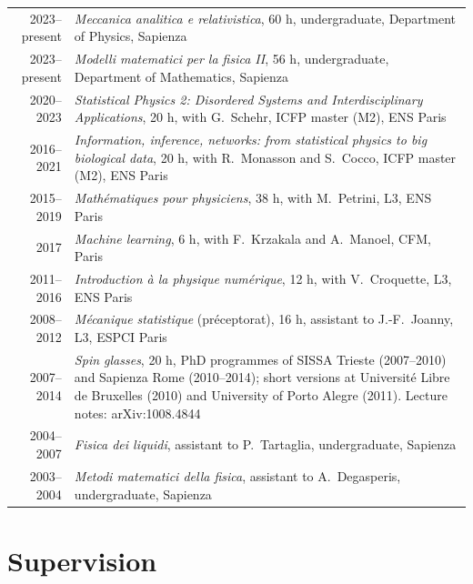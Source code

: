 \documentclass[a4paper,10pt]{article}
\begin{document}
\begin{tabularx}{\textwidth}{@{}D L@{}}
2023--present & \emph{Meccanica analitica e relativistica}, 60 h, undergraduate, Department of Physics, Sapienza \\
2023--present & \emph{Modelli matematici per la fisica II}, 56 h, undergraduate, Department of Mathematics, Sapienza \\
2020--2023 & \emph{Statistical Physics 2: Disordered Systems and Interdisciplinary Applications}, 20 h, with G.~Schehr, ICFP master (M2), ENS Paris \\
2016--2021 & \emph{Information, inference, networks: from statistical physics to big biological data}, 20 h, with R.~Monasson and S.~Cocco, ICFP master (M2), ENS Paris \\
2015--2019 & \emph{Mathématiques pour physiciens}, 38 h, with M.~Petrini, L3, ENS Paris \\
2017 & \emph{Machine learning}, 6 h, with F.~Krzakala and A.~Manoel, CFM, Paris \\
2011--2016 & \emph{Introduction à la physique numérique}, 12 h, with V.~Croquette, L3, ENS Paris \\
2008--2012 & \emph{Mécanique statistique} (préceptorat), 16 h, assistant to J.-F.~Joanny, L3, ESPCI Paris \\
2007--2014 & \emph{Spin glasses}, 20 h, PhD programmes of SISSA Trieste (2007--2010) and Sapienza Rome (2010--2014); short versions at Université Libre de Bruxelles (2010) and University of Porto Alegre (2011). Lecture notes: arXiv:1008.4844 \\
2004--2007 & \emph{Fisica dei liquidi}, assistant to P.~Tartaglia, undergraduate, Sapienza \\
2003--2004 & \emph{Metodi matematici della fisica}, assistant to A.~Degasperis, undergraduate, Sapienza \\
\end{tabularx}

\section{Supervision}
\end{document}
